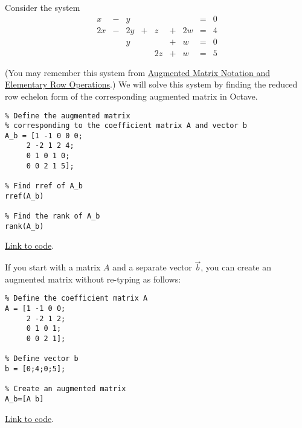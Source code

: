 \documentclass{ximera}
\begin{document}
\begin{template}\label{temp:rref}
Consider the system
\begin{equation}
\begin{array}{ccccccccc}
      x &- &y&&&&&= &0 \\
	 2x& -&2y&+&z&+&2w&=&4\\
     & &y&&&+&w&=&0\\
     & &&&2z&+&w&=&5
    \end{array}
    \end{equation}

 (You may remember this system from \href{https://ximera.osu.edu/linearalgebrav3/LinearAlgebraInteractiveIntro/SYS-0020/main}{Augmented Matrix Notation and Elementary Row Operations}.)  We will solve this system by finding the reduced row echelon form of the corresponding augmented matrix in Octave.  
    \begin{verbatim}
% Define the augmented matrix 
% corresponding to the coefficient matrix A and vector b
A_b = [1 -1 0 0 0;
     2 -2 1 2 4;
     0 1 0 1 0;
     0 0 2 1 5];
     
% Find rref of A_b
rref(A_b)

% Find the rank of A_b
rank(A_b)
    \end{verbatim}

\href{https://sagecell.sagemath.org/?z=eJxFjsEKwjAMhu-FvsN_Gehh0A49iYfB8CVEpOvSWWSt1Co-vumkmBCS_-cjSYOBnA-EfCOY17xQyDRhMTn5D2xMiZ6PGCYfZuS4UjaSc956JivXw4QJb7I5JoxS9NcRR5w1Wg1V8iAFSnRoO2huu-oo6F_9DYXC7C_VkaLByfMBfsYhOvB6KYrY8LSVgoUJ91V8ASwdNw8=&lang=octave&interacts=eJyLjgUAARUAuQ==}{Link to code}.    

\begin{remark}
    If you start with a matrix $A$ and a separate vector $\vec{b}$, you can create an augmented matrix without re-typing as follows:
    \begin{verbatim}
% Define the coefficient matrix A
A = [1 -1 0 0;
     2 -2 1 2;
     0 1 0 1;
     0 0 2 1];

% Define vector b
b = [0;4;0;5];

% Create an augmented matrix
A_b=[A b]
    \end{verbatim}

\href{https://sagecell.sagemath.org/?z=eJxFjrEKAyEQRHvBf5jmyoNVkkqukOQvjiOoWROL80BMyOdHIZLtHjvMvAlXjikz6pMRDo4xhcS5Yne1pA-sFBYLVoVZgUBGCvTTmDUU9GBCf6s_UouorbEU09h4c6hHgZfC904yJ0PmPEKXwq4yXIZ7PfbmwPefRXO4-WW18NsXtMsrmQ==&lang=octave&interacts=eJyLjgUAARUAuQ==}{Link to code}.
    \end{remark}
\end{template}
\end{document}
